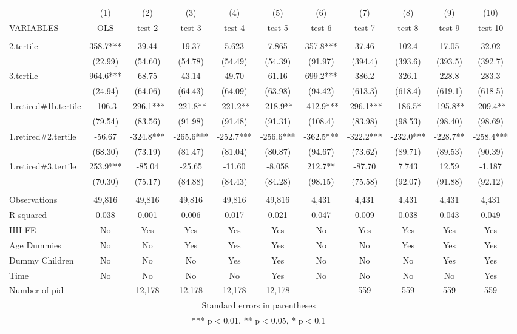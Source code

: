 \begin{tabular}{lcccccccccc} \hline
 & (1) & (2) & (3) & (4) & (5) & (6) & (7) & (8) & (9) & (10) \\
VARIABLES & OLS & test 2 & test 3 & test 4 & test 5 & test 6 & test 7 & test 8 & test 9 & test 10 \\ \hline
 &  &  &  &  &  &  &  &  &  &  \\
2.tertile & 358.7*** & 39.44 & 19.37 & 5.623 & 7.865 & 357.8*** & 37.46 & 102.4 & 17.05 & 32.02 \\
 & (22.99) & (54.60) & (54.78) & (54.49) & (54.39) & (91.97) & (394.4) & (393.6) & (393.5) & (392.7) \\
3.tertile & 964.6*** & 68.75 & 43.14 & 49.70 & 61.16 & 699.2*** & 386.2 & 326.1 & 228.8 & 283.3 \\
 & (24.94) & (64.06) & (64.43) & (64.09) & (63.98) & (94.42) & (613.3) & (618.4) & (619.1) & (618.5) \\
1.retired\#1b.tertile & -106.3 & -296.1*** & -221.8** & -221.2** & -218.9** & -412.9*** & -296.1*** & -186.5* & -195.8** & -209.4** \\
 & (79.54) & (83.56) & (91.98) & (91.48) & (91.31) & (108.4) & (83.98) & (98.53) & (98.40) & (98.69) \\
1.retired\#2.tertile & -56.67 & -324.8*** & -265.6*** & -252.7*** & -256.6*** & -362.5*** & -322.2*** & -232.0*** & -228.7** & -258.4*** \\
 & (68.30) & (73.19) & (81.47) & (81.04) & (80.87) & (94.67) & (73.62) & (89.71) & (89.53) & (90.39) \\
1.retired\#3.tertile & 253.9*** & -85.04 & -25.65 & -11.60 & -8.058 & 212.7** & -87.70 & 7.743 & 12.59 & -1.187 \\
 & (70.30) & (75.17) & (84.88) & (84.43) & (84.28) & (98.15) & (75.58) & (92.07) & (91.88) & (92.12) \\
 &  &  &  &  &  &  &  &  &  &  \\
Observations & 49,816 & 49,816 & 49,816 & 49,816 & 49,816 & 4,431 & 4,431 & 4,431 & 4,431 & 4,431 \\
R-squared & 0.038 & 0.001 & 0.006 & 0.017 & 0.021 & 0.047 & 0.009 & 0.038 & 0.043 & 0.049 \\
HH FE & No & Yes & Yes & Yes & Yes & No & Yes & Yes & Yes & Yes \\
Age Dummies & No & No & Yes & Yes & Yes & No & No & Yes & Yes & Yes \\
Dummy Children & No & No & No & Yes & Yes & No & No & No & Yes & Yes \\
Time & No & No & No & No & Yes & No & No & No & No & Yes \\
 Number of pid &  & 12,178 & 12,178 & 12,178 & 12,178 &  & 559 & 559 & 559 & 559 \\ \hline
\multicolumn{11}{c}{ Standard errors in parentheses} \\
\multicolumn{11}{c}{ *** p$<$0.01, ** p$<$0.05, * p$<$0.1} \\
\end{tabular}
